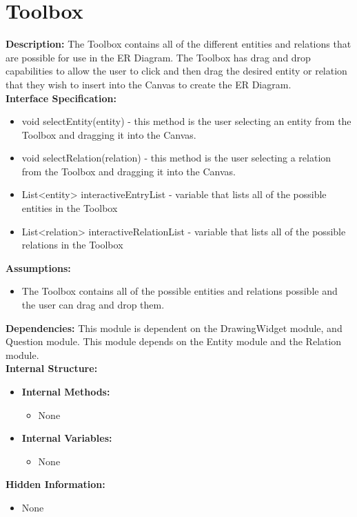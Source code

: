 


\chapter{Toolbox}
\textbf{Description:} The Toolbox contains all of the different entities and relations that are possible for use in the ER Diagram.  The Toolbox has drag and drop capabilities to allow the user to click and then drag the desired entity or relation that they wish to insert into the Canvas to create the ER Diagram. \\
\textbf{Interface Specification:}
\begin{itemize}
\item{void selectEntity(entity) - this method is the user selecting an entity from the Toolbox and dragging it into the Canvas.}
\item{void selectRelation(relation) - this method is the user selecting a relation from the Toolbox and dragging it into the Canvas.}   
\item{List<entity> interactiveEntryList - variable that lists all of the possible entities in the Toolbox}
\item{List<relation> interactiveRelationList - variable that lists all of the possible relations in the Toolbox}
\end{itemize}
\textbf{Assumptions:} 
\begin{itemize}
\item {The Toolbox contains all of the possible entities and relations possible and the user can drag and drop them.}
\end{itemize}
\textbf{Dependencies:} This module is dependent on the DrawingWidget module, and Question module.  This module depends on the Entity module and the Relation module. \\ 
\textbf{Internal Structure:}
\begin{itemize}
        	\item{\textbf{Internal Methods:} 
        	\begin{itemize}
        	\item{None}
        	\end{itemize}}
        	\item{\textbf{Internal Variables:} 
        	\begin{itemize}
        	\item{None}
        	\end{itemize}}
\end{itemize}
\textbf{Hidden Information:}
\begin{itemize}
\item{None} 
\end{itemize}
 
